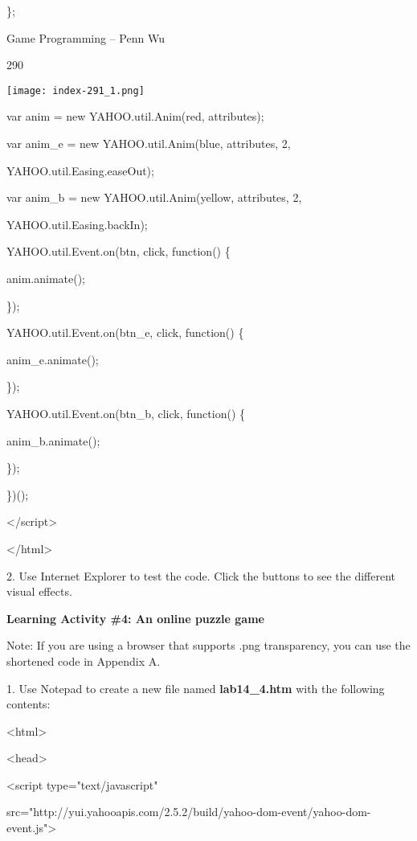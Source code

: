 \documentclass[
]{article}
\begin{document}
\};

Game Programming -- Penn Wu

290

\protect\hypertarget{index_split_015.htmlux5cux23p291}{}{}\texttt{[image: index-291\_1.png]}

var anim = new YAHOO.util.Anim(\textquotesingle red\textquotesingle,
attributes);

var anim\_e = new YAHOO.util.Anim(\textquotesingle blue\textquotesingle,
attributes, 2,

YAHOO.util.Easing.easeOut);

var anim\_b = new
YAHOO.util.Anim(\textquotesingle yellow\textquotesingle, attributes, 2,

YAHOO.util.Easing.backIn);

YAHOO.util.Event.on(\textquotesingle btn\textquotesingle,
\textquotesingle click\textquotesingle, function() \{

anim.animate();

\});

YAHOO.util.Event.on(\textquotesingle btn\_e\textquotesingle,
\textquotesingle click\textquotesingle, function() \{

anim\_e.animate();

\});

YAHOO.util.Event.on(\textquotesingle btn\_b\textquotesingle,
\textquotesingle click\textquotesingle, function() \{

anim\_b.animate();

\});

\})();

\textless/script\textgreater{}

\textless/html\textgreater{}

2. Use Internet Explorer to test the code. Click the buttons to see the
different visual effects.

\textbf{Learning Activity \#4: An online puzzle game}

Note: If you are using a browser that supports .png transparency, you
can use the shortened code in Appendix A.

\textbf{}

1. Use Notepad to create a new file named \textbf{lab14\_4.htm} with the
following contents:

\textless html\textgreater{}

\textless head\textgreater{}

\textless script type="text/javascript"

src="http://yui.yahooapis.com/2.5.2/build/yahoo-dom-event/yahoo-dom-event.js"\textgreater{}
\end{document}
